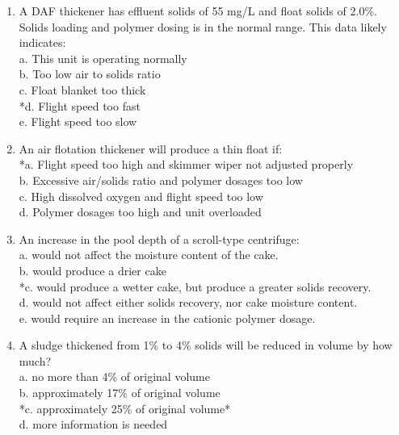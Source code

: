 \documentclass{article}
\begin{document}
\begin{enumerate}
\item A DAF thickener has effluent solids of 55 mg/L and float solids of 2.0\%. Solids loading and polymer dosing is in the normal range. This data likely indicates: \\

a. This unit is operating normally \\
b. Too low air to solids ratio \\
c. Float blanket too thick \\
*d. Flight speed too fast \\
e. Flight speed too slow \\

\item  An air flotation thickener will produce a thin float if: \\

*a. Flight speed too high and skimmer wiper not adjusted properly \\
b. Excessive air/solids ratio and polymer dosages too low \\
c. High dissolved oxygen and flight speed too low \\
d. Polymer dosages too high and unit overloaded \\

\item  An increase in the pool depth of a scroll-type centrifuge: \\

a. would not affect the moisture content of the cake. \\
b. would produce a drier cake \\
*c. would produce a wetter cake, but produce a greater solids recovery. \\
d. would not affect either solids recovery, nor cake moisture content. \\
e. would require an increase in the cationic polymer dosage. \\

\item  A sludge thickened from 1\% to 4\% solids will be reduced in volume by how much? \\

a. no more than 4\% of original volume \\
b. approximately 17\% of original volume \\
*c. approximately 25\% of original volume* \\
d. more information is needed \\


\end{enumerate}
\end{document}
